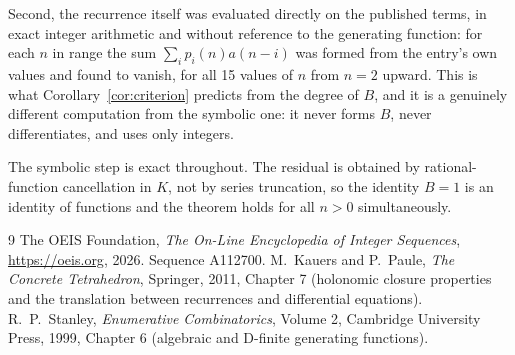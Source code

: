 \documentclass[11pt,a4paper]{article}
\theoremstyle{plain}
\theoremstyle{definition}
\begin{document}
Second, the recurrence itself was evaluated directly on the published terms, in exact
integer arithmetic and without reference to the generating function: for each $n$ in range
the sum $\sum_{i}p_{i}(n)a(n-i)$ was formed from the entry's own values and found to
vanish, for all 15 values of $n$ from $n=2$ upward. This is what
Corollary~\ref{cor:criterion} predicts from the degree of $B$, and it is a genuinely
different computation from the symbolic one: it never forms $B$, never differentiates, and
uses only integers.

The symbolic step is exact throughout. The residual is obtained by rational-function
cancellation in $K$, not by series truncation, so the identity $B=1$ is an
identity of functions and the theorem holds for all $n>0$ simultaneously.

\begin{thebibliography}{9}
 The OEIS Foundation, \emph{The On-Line Encyclopedia of Integer Sequences},
\url{https://oeis.org}, 2026. Sequence A112700.
 M.~Kauers and P.~Paule, \emph{The Concrete Tetrahedron}, Springer, 2011,
Chapter 7 (holonomic closure properties and the translation between recurrences and
differential equations).
 R.~P.~Stanley, \emph{Enumerative Combinatorics}, Volume 2, Cambridge
University Press, 1999, Chapter 6 (algebraic and D-finite generating functions).
\end{thebibliography}
\end{document}
